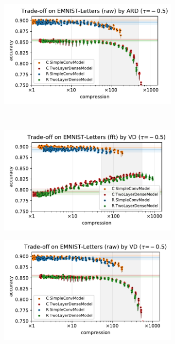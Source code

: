 \documentclass[a4paper,10pt,onecolumn]{article}
\begin{document}
\begin{figure}[b]
\begin{subfigure}[b]{0.5\columnwidth}
  \end{subfigure}%
  \begin{subfigure}[b]{0.5\columnwidth}
    \centering
    \includegraphics[width=\columnwidth]{figure__mnist-like__trade-off/appendix__ARD__emnist_letters__raw__-0.5.pdf}
  \end{subfigure} \\ %
  \begin{subfigure}[b]{0.5\columnwidth}
    \centering
    \includegraphics[width=\columnwidth]{figure__mnist-like__trade-off/appendix__VD__emnist_letters__fft__-0.5.pdf}
  \end{subfigure}%
  \begin{subfigure}[b]{0.5\columnwidth}
    \centering
    \includegraphics[width=\columnwidth]{figure__mnist-like__trade-off/appendix__VD__emnist_letters__raw__-0.5.pdf}

\end{subfigure}
\end{figure}
\end{document}
